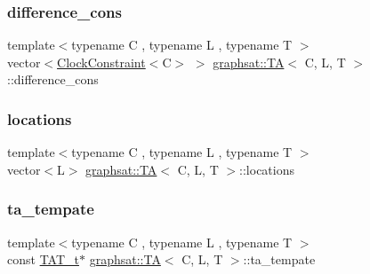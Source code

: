 \subsubsection{\texorpdfstring{difference\_cons}{difference\_cons}}
{\footnotesize\ttfamily template$<$typename C , typename L , typename T $>$ \\
vector$<$\mbox{\hyperlink{classgraphsat_1_1_clock_constraint}{Clock\+Constraint}}$<$C$>$ $>$ \mbox{\hyperlink{classgraphsat_1_1_t_a}{graphsat\+::\+TA}}$<$ C, L, T $>$\+::difference\+\_\+cons\hspace{0.3cm}{\ttfamily [private]}}

\mbox{\label{classgraphsat_1_1_t_a_a0b4b46f5854b0e35b741fd7e82df4046}} 
\subsubsection{\texorpdfstring{locations}{locations}}
{\footnotesize\ttfamily template$<$typename C , typename L , typename T $>$ \\
vector$<$L$>$ \mbox{\hyperlink{classgraphsat_1_1_t_a}{graphsat\+::\+TA}}$<$ C, L, T $>$\+::locations\hspace{0.3cm}{\ttfamily [private]}}

\mbox{\label{classgraphsat_1_1_t_a_a70a95125e666079a25f808fe99ca6fe0}} 
\subsubsection{\texorpdfstring{ta\_tempate}{ta\_tempate}}
{\footnotesize\ttfamily template$<$typename C , typename L , typename T $>$ \\
const \mbox{\hyperlink{classgraphsat_1_1_t_a_a9d81348f6a488c20a885e5eed6cd8a14}{T\+A\+T\+\_\+t}}$\ast$ \mbox{\hyperlink{classgraphsat_1_1_t_a}{graphsat\+::\+TA}}$<$ C, L, T $>$\+::ta\+\_\+tempate\hspace{0.3cm}{\ttfamily [private]}}

\mbox{\label{classgraphsat_1_1_t_a_a2525c9f51319ca318285566c52e6b9d1}} 
